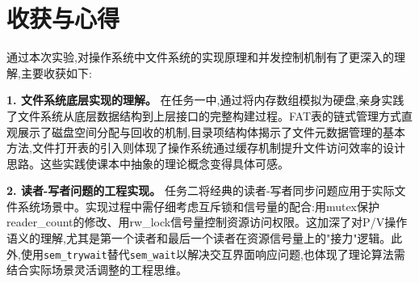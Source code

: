 \section{收获与心得}
通过本次实验,对操作系统中文件系统的实现原理和并发控制机制有了更深入的理解,主要收获如下:

\textbf{1. 文件系统底层实现的理解。} 在任务一中,通过将内存数组模拟为硬盘,亲身实践了文件系统从底层数据结构到上层接口的完整构建过程。FAT表的链式管理方式直观展示了磁盘空间分配与回收的机制,目录项结构体揭示了文件元数据管理的基本方法,文件打开表的引入则体现了操作系统通过缓存机制提升文件访问效率的设计思路。这些实践使课本中抽象的理论概念变得具体可感。

\textbf{2. 读者-写者问题的工程实现。} 任务二将经典的读者-写者同步问题应用于实际文件系统场景中。实现过程中需仔细考虑互斥锁和信号量的配合:用mutex保护reader\_count的修改、用rw\_lock信号量控制资源访问权限。这加深了对P/V操作语义的理解,尤其是第一个读者和最后一个读者在资源信号量上的"接力"逻辑。此外,使用\texttt{sem\_trywait}替代\texttt{sem\_wait}以解决交互界面响应问题,也体现了理论算法需结合实际场景灵活调整的工程思维。
